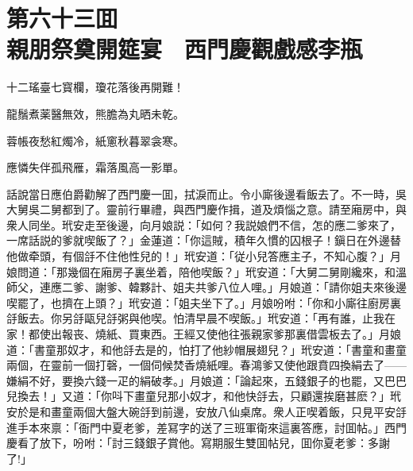
\chapter*{第六十三囬　\\親朋祭奠開筵宴　西門慶觀戲感李瓶}


\begin{myquote}
十二瑤臺七寳欄，瓊花落後再開難！

龍鬚煮薬醫無效，熊膽為丸晒未乾。

蓉帳夜愁紅燭冷，紙窻秋暮翠衾寒。

應憐失伴孤飛雁，霜落風高一影單。
\end{myquote}

話說當日應伯爵勸解了西門慶一囬，拭淚而止。令小廝後邊看飯去了。不一時，吳大舅吳二舅都到了。靈前行畢禮，與西門慶作揖，道及煩惱之意。請至廂房中，與衆人同坐。玳安走至後邊，向月娘説：「如何？我説娘們不信，怎的應二爹來了，一席話説的爹就喫飯了？」金蓮道：「你這賊，積年久慣的囚根子！鎭日在外邊替他做牵頭，有個㧱不住他性兒的！」玳安道：「従小兒答應主子，不知心腹？」月娘問道：「那幾個在廂房子裏坐着，陪他喫飯？」玳安道：「大舅二舅剛纔來，和溫師父，連應二爹、謝爹、韓夥計、姐夫共爹八位人哩。」月娘道：「請你姐夫來後邊喫罷了，也擠在上頭？」玳安道：「姐夫坐下了。」月娘吩咐：「你和小廝往廚房裏㧱飯去。你另㧱甌兒㧱粥與他喫。怕清早晨不喫飯。」玳安道：「再有誰，止我在家！都使出報丧、燒紙、買東西。王經又使他往張親家爹那裏借雲板去了。」月娘道：「書童那奴才，和他㧱去是的，怕打了他紗帽展翅兒？」玳安道：「書童和畫童兩個，在靈前一個打磬，一個伺候焚香燒紙哩。春鴻爹又使他跟賁四換絹去了——嫌絹不好，要換六錢一疋的絹破孝。」月娘道：「論起來，五錢銀子的也罷，又巴巴兒換去！」又道：「你呌下畫童兒那小奴才，和他快㧱去，只顧還挨磨甚麽？」玳安於是和畫童兩個大盤大碗㧱到前邊，安放八仙桌席。衆人正喫着飯，只見平安㧱進手本來禀：「衙門中夏老爹，差冩字的送了三班軍衛來這裏答應，討囬帖。」西門慶看了放下，吩咐：「討三錢銀子賞他。寫期服生雙囬帖兒，囬你夏老爹：多謝了!」

